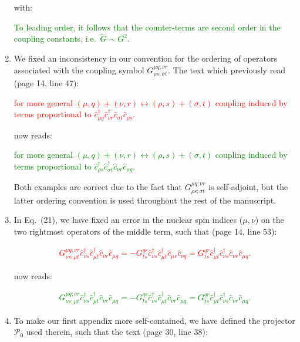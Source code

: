 \documentclass[preprint]{revtex4-1}
\newcommand{\p}[1]{\left(#1\right)} %
\renewcommand{\c}{\hat{c}}
\renewcommand{\P}{\mathcal{P}}
\newcommand{\1}{\mathds{1}}
\newcommand{\red}[1]{\textcolor{red}{#1}}
\newcommand{\green}[1]{\textcolor{green}{#1}}
\begin{document}
\begin{enumerate}[label=(R3.\arabic*)]
  with:

  \green{To leading order, it follows that the counter-terms are
    second order in the coupling constants, i.e.~$\tilde G\sim G^2$.}


\item We fixed an inconsistency in our convention for the ordering of
  operators associated with the coupling symbol
  $G^{\mu q;\nu r}_{\rho s;\sigma t}$.  The text which previously read
  (page 14, line 47):

  \red{for more general
    $\p{\mu,q}+\p{\nu,r}\leftrightarrow\p{\rho,s}+\p{\sigma,t}$
    coupling induced by terms proportional to
    $\c_{\mu q}^\dag \c_{\nu r}^\dag \c_{\sigma t} \c_{\rho s}$.}

  now reads:

  \green{for more general
    $\p{\mu,q}+\p{\nu,r}\leftrightarrow\p{\rho,s}+\p{\sigma,t}$
    coupling induced by terms proportional to
    $\c_{\rho s}^\dag \c_{\sigma t}^\dag \c_{\nu r} \c_{\mu q}$.}

  Both examples are correct due to the fact that
  $G^{\mu q;\nu r}_{\rho s;\sigma t}$ is self-adjoint, but the latter
  ordering convention is used throughout the rest of the manuscript.



\item In Eq.~(21), we have fixed an error in the nuclear spin indices
  ($\mu,\nu$) on the two rightmost operators of the middle term, such
  that (page 14, line 53):

  \red{\begin{align*}
      G^{\mu q;\nu r}_{\nu s;\mu t}
      \c_{\nu s}^\dag \c_{\mu t}^\dag \c_{\nu r} \c_{\mu q}
      = -G^{qr}_{ts} \c_{\nu s}^\dag \c_{\mu t}^\dag \c_{\mu r} \c_{\nu q}
      = G^{qr}_{ts} \c_{\mu t}^\dag \c_{\nu s}^\dag \c_{\nu r} \c_{\mu q}.
      \tag{21}
    \end{align*}}

  now reads:

  \green{\begin{align*}
      G^{\mu q;\nu r}_{\nu s;\mu t}
      \c_{\nu s}^\dag \c_{\mu t}^\dag \c_{\nu r} \c_{\mu q}
      = -G^{qr}_{ts} \c_{\nu s}^\dag \c_{\mu t}^\dag \c_{\nu r} \c_{\mu q}
      = G^{qr}_{ts} \c_{\mu t}^\dag \c_{\nu s}^\dag \c_{\nu r} \c_{\mu q}.
      \tag{21}
    \end{align*}}


\item To make our first appendix more self-contained, we have defined
  the projector $\P_0$ used therein, such that the text (page 30, line
  38):


\end{enumerate}
\end{document}
